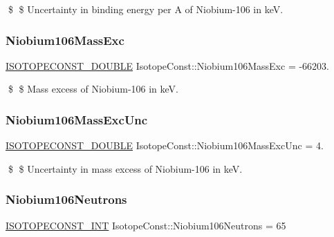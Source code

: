 \$ \$ Uncertainty in binding energy per A of Niobium-\/106 in keV. \mbox{\label{group___isotope_const-_niobium-_nb106_ga1be6be716bd9f41d0939bd06ad97ee54}} 
\subsubsection{\texorpdfstring{Niobium106\+Mass\+Exc}{Niobium106MassExc}}
{\footnotesize\ttfamily \mbox{\hyperlink{group___isotope_const-_macros_ga8f45a7272ce02c0b4c65c44636ed719a}{I\+S\+O\+T\+O\+P\+E\+C\+O\+N\+S\+T\+\_\+\+D\+O\+U\+B\+LE}} Isotope\+Const\+::\+Niobium106\+Mass\+Exc = -\/66203.}

\$ \$ Mass excess of Niobium-\/106 in keV. \mbox{\label{group___isotope_const-_niobium-_nb106_gadb7da85d50b8223423912a0614b09106}} 
\subsubsection{\texorpdfstring{Niobium106\+Mass\+Exc\+Unc}{Niobium106MassExcUnc}}
{\footnotesize\ttfamily \mbox{\hyperlink{group___isotope_const-_macros_ga8f45a7272ce02c0b4c65c44636ed719a}{I\+S\+O\+T\+O\+P\+E\+C\+O\+N\+S\+T\+\_\+\+D\+O\+U\+B\+LE}} Isotope\+Const\+::\+Niobium106\+Mass\+Exc\+Unc = 4.}

\$ \$ Uncertainty in mass excess of Niobium-\/106 in keV. \mbox{\label{group___isotope_const-_niobium-_nb106_ga35d3e838613392b8c39d2f82e1fa2a35}} 
\subsubsection{\texorpdfstring{Niobium106\+Neutrons}{Niobium106Neutrons}}
{\footnotesize\ttfamily \mbox{\hyperlink{group___isotope_const-_macros_ga5f18360b3e99483a35c32d789e62621c}{I\+S\+O\+T\+O\+P\+E\+C\+O\+N\+S\+T\+\_\+\+I\+NT}} Isotope\+Const\+::\+Niobium106\+Neutrons = 65}

